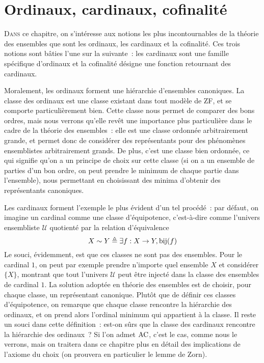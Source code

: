 \chapter{Ordinaux, cardinaux, cofinalité}
\label{chp.ordinaux}

\minitoc

\lettrine{D}{ans} ce chapitre, on s'intéresse aux notions les plus
incontournables de la théorie des ensembles que sont les ordinaux, les cardinaux
et la cofinalité. Ces trois notions sont bâties l'une sur la suivante~: les
cardinaux sont une famille spécifique d'ordinaux et la cofinalité désigne une
fonction retournant des cardinaux.

Moralement, les ordinaux forment une hiérarchie d'ensembles canoniques. La
classe des ordinaux est une classe existant dans tout modèle de ZF, et se
comporte particulièrement bien. Cette classe nous permet de comparer des bons
ordres, mais nous verrons qu'elle revêt une importance plus particulière dans le
cadre de la théorie des ensembles~: elle est une classe ordonnée arbitrairement
grande, et permet donc de considérer des représentants pour des phénomènes
ensemblistes arbitrairement grands. De plus, c'est une classe bien ordonnée,
ce qui signifie qu'on a un principe de choix sur cette classe (si on a un
ensemble de parties d'un bon ordre, on peut prendre le minimum de chaque partie
dans l'ensemble), nous permettant en choisissant des minima d'obtenir des
représentants canoniques.

Les cardinaux forment l'exemple le plus évident d'un tel procédé~: par défaut,
on imagine un cardinal comme une classe d'équipotence, c'est-à-dire comme
l'univers ensembliste $\mathcal U$ quotienté par la relation d'équivalence
\[X\sim Y \triangleq \exists f : X \to Y, \mathrm{bij}(f)\]
Le souci, évidemment, est que ces classes ne sont pas des ensembles. Pour le
cardinal $1$, on peut par exemple prendre n'importe quel ensemble $X$ et
considérer $\{X\}$, montrant que tout l'univers $\mathcal U$ peut être injecté
dans la classe des ensembles de cardinal $1$. La solution adoptée en théorie des
ensembles est de choisir, pour chaque classe, un représentant canonique.
Plutôt que de définir ces classes d'équipotence, on remarque que chaque classe
rencontre la hiérarchie des ordinaux, et on prend alors l'ordinal minimum qui
appartient à la classe. Il reste un souci dans cette définition~: est-on sûrs
que la classe des cardinaux rencontre la hiérarchie des ordinaux~? Si l'on
admet $\operatorname{AC}$, c'est le cas, comme nous le verrons, mais on traitera dans ce
chapitre plus en détail des implications de l'axiome du choix (on prouvera
en particulier le lemme de Zorn).

